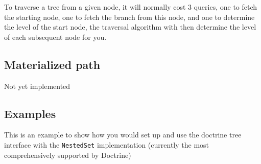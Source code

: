 \documentclass[11pt,a4paper]{report}
\begin{document}
To traverse a tree from a given node, it will normally cost 3 queries, one to fetch the starting node, one to fetch the branch from this node, and one to determine the level of the start node, the traversal algorithm with then determine the level of each subsequent node for you.

\subsection{Materialized path}
Not yet implemented

\subsection{Examples}
This is an example to show how you would set up and use the doctrine tree interface with the \texttt{NestedSet} implementation (currently the most comprehensively supported by Doctrine)
\end{document}
